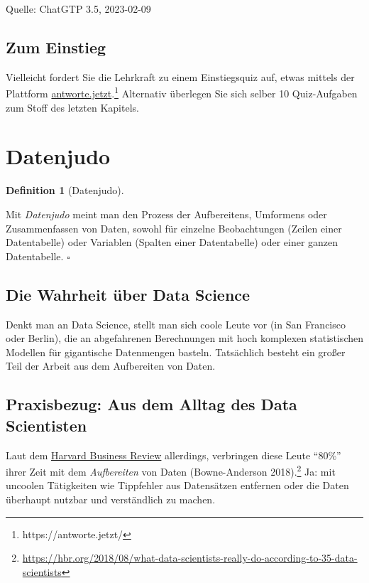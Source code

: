 \documentclass[
  a4paper,
  DIV=11]{scrreprt}
\theoremstyle{definition}
\theoremstyle{definition}
\theoremstyle{definition}
\newtheorem{definition}{Definition}[chapter]
\theoremstyle{remark}
\begin{document}
Quelle: ChatGTP 3.5, 2023-02-09

\subsection{Zum Einstieg}\label{zum-einstieg}

Vielleicht fordert Sie die Lehrkraft zu einem Einstiegsquiz auf, etwas
mittels der Plattform
\href{https://antworte.jetzt/}{antworte.jetzt}.\footnote{https://antworte.jetzt/}
Alternativ überlegen Sie sich selber 10 Quiz-Aufgaben zum Stoff des
letzten Kapitels.

\section{Datenjudo}\label{datenjudo}

\begin{definition}[Datenjudo]\protect\hypertarget{def-datenjudo}{}\label{def-datenjudo}

Mit \emph{Datenjudo} meint man den Prozess der Aufbereitens, Umformens
oder Zusammenfassen von Daten, sowohl für einzelne Beobachtungen (Zeilen
einer Datentabelle) oder Variablen (Spalten einer Datentabelle) oder
einer ganzen Datentabelle. \(\square\)

\end{definition}

\subsection{Die Wahrheit über Data
Science}\label{die-wahrheit-uxfcber-data-science}

Denkt man an Data Science, stellt man sich coole Leute vor (in San
Francisco oder Berlin), die an abgefahrenen Berechnungen mit hoch
komplexen statistischen Modellen für gigantische Datenmengen basteln.
Tatsächlich besteht ein großer Teil der Arbeit aus dem Aufbereiten von
Daten.

\subsection{Praxisbezug: Aus dem Alltag des Data
Scientisten}\label{praxisbezug-aus-dem-alltag-des-data-scientisten}

Laut dem
\href{https://hbr.org/2018/08/what-data-scientists-really-do-according-to-35-data-scientists}{Harvard
Business Review} allerdings, verbringen diese Leute ``80\%'' ihrer Zeit
mit dem \emph{Aufbereiten} von Daten (Bowne-Anderson 2018).\footnote{\url{https://hbr.org/2018/08/what-data-scientists-really-do-according-to-35-data-scientists}}
Ja: mit uncoolen Tätigkeiten wie Tippfehler aus Datensätzen entfernen
oder die Daten überhaupt nutzbar und verständlich zu machen.
\end{document}
